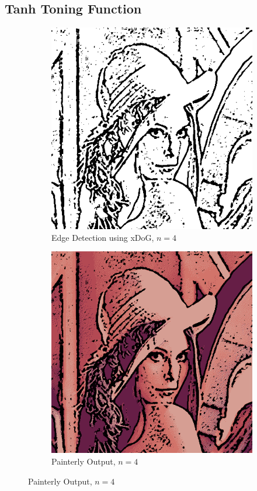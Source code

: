\documentclass{article}
\begin{document}
\subsection{Tanh Toning Function}

\begin{figure}[!ht]
\begin{subfigure}{.5\textwidth}
\centering
\includegraphics[width=.75\linewidth]{xdog4.png}
\caption{Edge Detection using xDoG, $n = 4$}
\end{subfigure}
\begin{subfigure}{.5\textwidth}
\centering
\includegraphics[width=.75\linewidth]{pastel4.png}
\caption{Painterly Output, $n = 4$}
\end{subfigure}
\end{figure}
\end{document}
